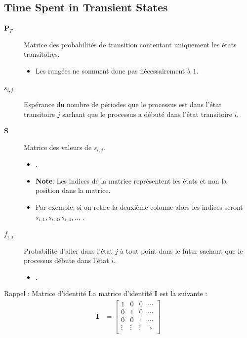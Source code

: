 \documentclass[10pt, french]{article}
\begin{document}
\begin{multicols*}{2}
\subsection{Time Spent in Transient States}
\begin{distributions}[Notation]
\begin{description}
	\item[$\bm{P}_{T}$]Matrice des probabilités de transition contentant uniquement les états transitoires.
		\begin{itemize}
		\item	Les rangées ne somment donc pas nécessairement à $1$.
		\end{itemize}
	\item[$s_{i, j}$]	Espérance du nombre de périodes que le processus est dans l'état transitoire $j$ sachant que le processus a débuté dans l'état transitoire $i$.
	\item[$\bm{S}$]	Matrice des valeurs de $s_{i, j}$.
		\begin{itemize}
		\item	{}.
		\item	\textbf{Note}: Les indices de la matrice représentent les états et non la position dans la matrice. 
		\item	Par exemple, si on retire la deuxième colonne alors les indices seront $s_{i, 1}, s_{i, 3}, s_{i, 4}, \dots$	.
		\end{itemize}
	\item[$f_{i, j}$]	Probabilité d'aller dans l'état $j$ à tout point dans le futur sachant que le processus débute dans l'état $i$.
		\begin{itemize}
		\item	{}.
		\end{itemize}
\end{description}
\end{distributions}

\begin{rappel}{Rappel : Matrice d'identité}
La matrice d'identité $\bm{I}$ est la suivante : \\
\begin{align*}
	\bm{I}
	&=	\begin{bmatrix}
		1	&	0	&	0	&	\cdots	\\
		0	&	1	&	0	&	\cdots	\\
		0	&	0	&	1	&	\cdots	\\
		\vdots	&	\vdots	&	\vdots	&	\ddots	\\
	\end{bmatrix}
\end{align*}


\end{rappel}
\end{multicols*}
\end{document}
